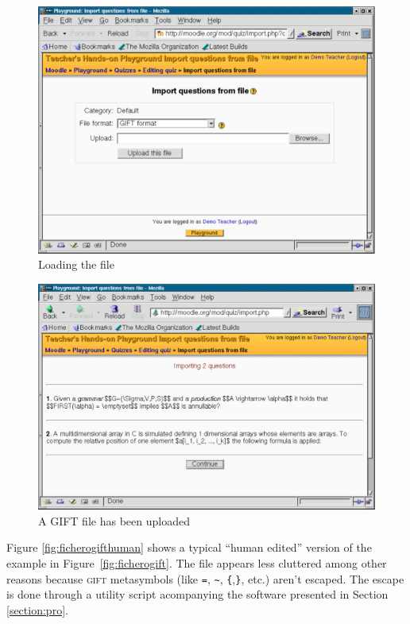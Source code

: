 \documentclass{pracjourn}[2006/02/20]
\begin{document}
\begin{figure}[!ht]
  \begin{center}
    \includegraphics[scale=0.3]{importFromfile}
  \end{center}
\caption{Loading the file}
\label{fig:quiz:2}
\end{figure}

\begin{figure}[!ht]
  \begin{center}
    \includegraphics[scale=0.3]{importing2questions}
  \end{center}
\caption{A GIFT file has been uploaded}
\label{fig:quiz:3}
\end{figure}

Figure \ref{fig:ficherogifthuman} shows  a typical
``human edited'' version
of the example in Figure~\ref{fig:ficherogift}. 
The file appears less cluttered among other reasons because
\textsc{gift} metasymbols (like \verb|=|, \verb|~|, 
\verb|{|,\verb|}|, etc.) aren't escaped.
The escape is done through a utility script acompanying
the software presented in Section 
\ref{section:pro}.
\end{document}
